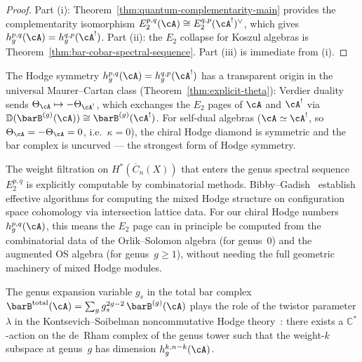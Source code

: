 \begin{proof}
Part (i): Theorem~\ref{thm:quantum-complementarity-main}
provides the complementarity isomorphism
$E_2^{p,q}(\cA) \cong E_2^{q,p}(\cA^!)^\vee$, which gives
$h^{p,q}_g(\cA) = h^{q,p}_g(\cA^!)$.  Part (ii): the $E_2$
collapse for Koszul algebras is
Theorem~\ref{thm:bar-cobar-spectral-sequence}.  Part (iii)
is immediate from (i).
\end{proof}

\begin{remark}
\label{rem:hodge-theta}
The Hodge symmetry $h^{p,q}_g(\cA) = h^{q,p}_g(\cA^!)$
has a transparent origin in the universal Maurer--Cartan
class (Theorem~\ref{thm:explicit-theta}): Verdier duality
sends $\Theta_\cA \mapsto -\Theta_{\cA^!}$, which
exchanges the $E_2$ pages of $\cA$ and $\cA^!$ via
$\mathbb{D}(\barB^{(g)}(\cA)) \cong \barB^{(g)}(\cA^!)$.
For self-dual algebras ($\cA \simeq \cA^!$, so
$\Theta_\cA = -\Theta_\cA = 0$, i.e.\ $\kappa = 0$),
the chiral Hodge diamond is symmetric and the bar complex
is uncurved --- the strongest form of Hodge symmetry.
\end{remark}

\begin{remark}\label{rem:weight-filtration-computable}
The weight filtration on $H^*(\overline{C}_n(X))$ that enters the genus spectral sequence $E_2^{p,q}$ is explicitly computable by combinatorial methods.  Bibby--Gadish~\cite{BG24} establish effective algorithms for computing the mixed Hodge structure on configuration space cohomology via intersection lattice data.  For our chiral Hodge numbers $h^{p,q}_g(\cA)$, this means the $E_2$ page can in principle be computed from the combinatorial data of the Orlik--Solomon algebra (for genus~$0$) and the augmented OS algebra (for genus~$g \geq 1$), without needing the full geometric machinery of mixed Hodge modules.
\end{remark}

\begin{conjecture}\label{conj:nc-hodge}
The genus expansion variable $g_s$ in the total bar complex
$\barB^{\mathrm{total}}(\cA) = \sum_g g_s^{2g-2}\, \barB^{(g)}(\cA)$
plays the role of the twistor parameter $\lambda$ in the
Kontsevich--Soibelman noncommutative Hodge
theory~\cite{KontsevichSoibelman}: there exists a
$\mathbb{C}^*$-action on the de~Rham complex of the genus tower
such that the weight-$k$ subspace at genus~$g$ has dimension
$h^{k,n-k}_g(\cA)$.
\end{conjecture}

